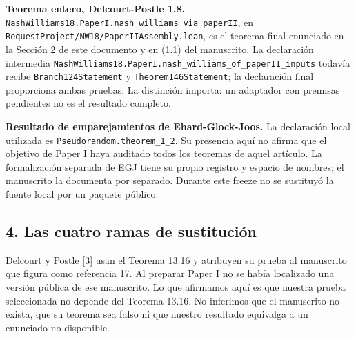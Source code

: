 \documentclass[spanish,11pt,a4paper]{article}
\begin{document}
\textbf{Teorema entero, Delcourt-Postle 1.8.} \texttt{Nash\allowbreak{}Williams18.\allowbreak{}Paper\allowbreak{}I.\allowbreak{}nash\_\allowbreak{}williams\_\allowbreak{}via\_\allowbreak{}paper\allowbreak{}II}, en \texttt{Request\allowbreak{}Project/\allowbreak{}NW18/\allowbreak{}Paper\allowbreak{}IIAssembly.\allowbreak{}lean}, es el teorema final enunciado en la Sección 2 de este documento y en (1.1) del manuscrito. La declaración intermedia \texttt{Nash\allowbreak{}Williams18.\allowbreak{}Paper\allowbreak{}I.\allowbreak{}nash\_\allowbreak{}williams\_\allowbreak{}of\_\allowbreak{}paper\allowbreak{}II\_\allowbreak{}inputs} todavía recibe \texttt{Branch124Statement} y \texttt{Theorem146Statement}; la declaración final proporciona ambas pruebas. La distinción importa: un adaptador con premisas pendientes no es el resultado completo.

\textbf{Resultado de emparejamientos de Ehard-Glock-Joos.} La declaración local utilizada es \texttt{Pseudorandom.\allowbreak{}theorem\_\allowbreak{}1\_\allowbreak{}2}. Su presencia aquí no afirma que el objetivo de Paper I haya auditado todos los teoremas de aquel artículo. La formalización separada de EGJ tiene su propio registro y espacio de nombres; el manuscrito la documenta por separado. Durante este freeze no se sustituyó la fuente local por un paquete público.


\subsection{4. Las cuatro ramas de sustitución}\label{las-cuatro-ramas-de-sustituciuxf3n}

Delcourt y Postle {[}3{]} usan el Teorema 13.16 y atribuyen su prueba al manuscrito que figura como referencia 17. Al preparar Paper I no se había localizado una versión pública de ese manuscrito. Lo que afirmamos aquí es que nuestra prueba seleccionada no depende del Teorema 13.16. No inferimos que el manuscrito no exista, que su teorema sea falso ni que nuestro resultado equivalga a un enunciado no disponible.
\end{document}
